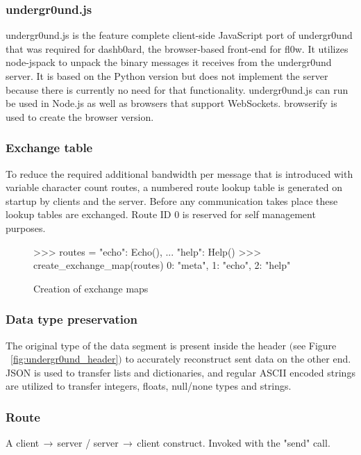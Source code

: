 \documentclass[conference]{IEEEtran}
\begin{document}
\subsubsection{undergr0und.js}
undergr0und.js is the feature complete client-side JavaScript port of undergr0und that was required for dashb0ard, the browser-based front-end for fl0w. It utilizes node-jspack to unpack the binary messages it receives from the undergr0und server. It is based on the Python version but does not implement the server because there is currently no need for that functionality. undergr0und.js can run be used in Node.js\cite{Node.js:Node.js Foundation} as well as browsers that support WebSockets\cite{The WebSocket Protocol:A. Melnikov}. browserify\cite{browserify:James Halliday} is used to create the browser version.

\subsubsection{Exchange table}
To reduce the required additional bandwidth per message that is introduced with variable character count routes, a numbered route lookup table is generated on startup by clients and the server. Before any communication takes place these lookup tables are exchanged. Route ID 0 is reserved for self management purposes.

\begin{figure}[H]
\centering
\begin{python}
>>> routes = {"echo": Echo(),
...    "help": Help()}
>>> create_exchange_map(routes)
{0: "meta", 1: "echo", 2: "help"}
\end{python}
\caption{Creation of exchange maps}
\end{figure}

\subsubsection{Data type preservation}
The original type of the data segment is present inside the header $($see Figure ~\ref{fig:undergr0und_header}$)$ to accurately reconstruct sent data on the other end. JSON\cite{JSON:T. Bray Ed.} is used to transfer lists and dictionaries, and regular ASCII encoded strings are utilized to transfer integers, floats, null/none types and strings.

\subsubsection{Route}
A client$\,\to\,$server / server$\,\to\,$client construct. Invoked with the {\color{deepgreen}"send"} call.
\end{document}
